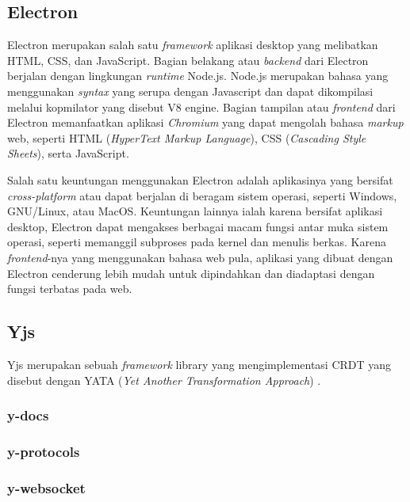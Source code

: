 \subsection{Electron}

Electron merupakan salah satu \textit{framework} aplikasi desktop yang melibatkan HTML, CSS, dan JavaScript. Bagian belakang atau \textit{backend} dari Electron berjalan dengan lingkungan \textit{runtime} Node.js. Node.js merupakan bahasa yang menggunakan \textit{syntax} yang serupa dengan Javascript dan dapat dikompilasi melalui kopmilator yang disebut V8 engine. Bagian tampilan atau \textit{frontend} dari Electron memanfaatkan aplikasi \textit{Chromium} yang dapat mengolah bahasa \textit{markup} web, seperti HTML (\textit{HyperText Markup Language}), CSS (\textit{Cascading Style Sheets}), serta JavaScript.

Salah satu keuntungan menggunakan Electron adalah aplikasinya yang bersifat \textit{cross-platform} atau dapat berjalan di beragam sistem operasi, seperti Windows, GNU/Linux, atau MacOS. Keuntungan lainnya ialah karena bersifat aplikasi desktop, Electron dapat mengakses berbagai macam fungsi antar muka sistem operasi, seperti memanggil subproses pada kernel dan menulis berkas. Karena \textit{frontend}-nya yang menggunakan bahasa web pula, aplikasi yang dibuat dengan Electron cenderung lebih mudah untuk dipindahkan dan diadaptasi dengan fungsi terbatas pada web.


\subsection{Yjs}

Yjs merupakan sebuah \textit{framework} library yang mengimplementasi CRDT yang disebut dengan YATA (\textit{Yet Another Transformation Approach}) \citep{Nicolaescu2016yjs}. 

\subsubsection{y-docs}

\subsubsection{y-protocols}

\subsubsection{y-websocket}

